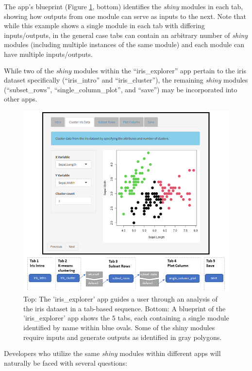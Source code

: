 The app's blueprint (Figure \ref{fig:fig2}, bottom) identifies the \emph{shiny} modules in each tab, showing how outputs from one module can serve as inputs to the next. Note that while this example shows a single module in each tab with differing inputs/outputs, in the general case tabs can contain an arbitrary number of \emph{shiny} modules (including multiple instances of the same module) and each module can have multiple inputs/outputs.

While two of the \emph{shiny} modules within the ``iris\_explorer'' app pertain to the iris dataset specifically (``iris\_intro'' and ``iris\_cluster''), the remaining \emph{shiny} modules (``subset\_rows'', ``single\_column\_plot'', and ``save'') may be incorporated into other apps.

\begin{figure}[h]
\includegraphics[width=1\linewidth]{images/figure2} \caption{Top:  The 'iris\_explorer' app guides a user through an analysis of the iris dataset in a tab-based sequence.  Bottom:  A blueprint of the 'iris\_explorer' app shows the 5 tabs, each containing a single module identified by name within blue ovals. Some of the shiny modules require inputs and generate outputs as identified in gray polygons.}\label{fig:fig2}
\end{figure}

\newpage

Developers who utilize the same \emph{shiny} modules within different apps will naturally be faced with several questions:

